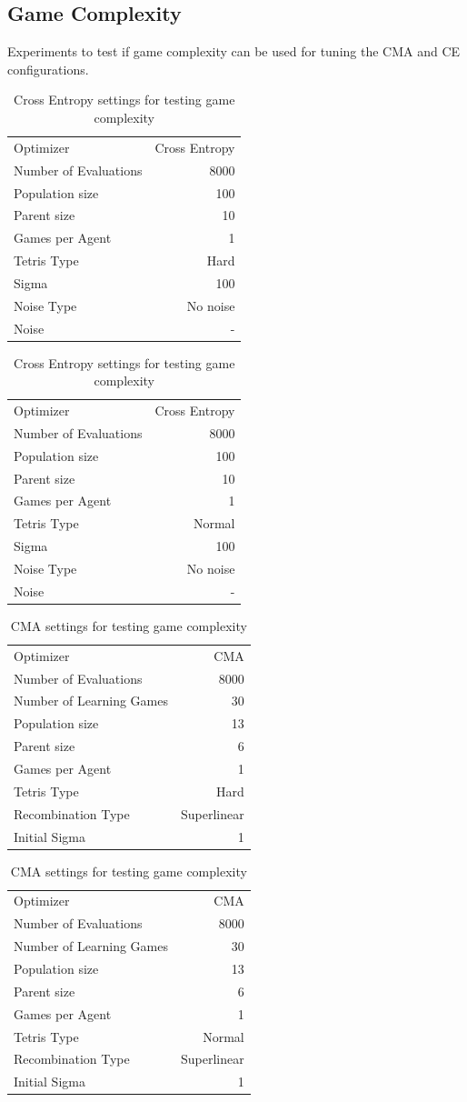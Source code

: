 \subsection{Game Complexity \label{AppendixGameComplexity}}
Experiments to test if game complexity can be used for tuning the CMA and CE configurations.

\begin{table}[h]
\centering
\begin{tabular}{l r}
Optimizer & Cross Entropy\\
Number of Evaluations & 8000\\
Population size & 100\\
Parent size & 10\\
Games per Agent & 1\\
Tetris Type & Hard\\
\hline
Sigma & 100\\
Noise Type & No noise\\
Noise & -
\end{tabular}
\quad
\begin{tabular}{l r}
Optimizer & Cross Entropy\\
Number of Evaluations & 8000\\
Population size & 100\\
Parent size & 10\\
Games per Agent & 1\\
Tetris Type & Normal\\
\hline
Sigma & 100\\
Noise Type & No noise\\
Noise & -
\end{tabular}
\caption{Cross Entropy settings for testing game complexity}
\end{table}

\begin{table}[h]
\centering
\begin{tabular}{l r}
Optimizer & CMA\\
Number of Evaluations & 8000\\
Number of Learning Games & 30\\
Population size& 13\\
Parent size & 6\\
Games per Agent & 1\\
Tetris Type & Hard\\
\hline
Recombination Type & Superlinear\\
Initial Sigma & 1
\end{tabular}
\quad
\begin{tabular}{l r}
Optimizer & CMA\\
Number of Evaluations & 8000\\
Number of Learning Games & 30\\
Population size& 13\\
Parent size & 6\\
Games per Agent & 1\\
Tetris Type & Normal\\
\hline
Recombination Type & Superlinear\\
Initial Sigma & 1
\end{tabular}
\caption{CMA settings for testing game complexity}
\end{table}

